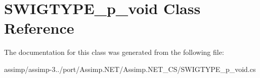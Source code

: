 \hypertarget{class_s_w_i_g_t_y_p_e__p__void}{\section{S\+W\+I\+G\+T\+Y\+P\+E\+\_\+p\+\_\+void Class Reference}
\label{class_s_w_i_g_t_y_p_e__p__void}
}


The documentation for this class was generated from the following file\+:\begin{DoxyCompactItemize}
\item 
assimp/assimp-\/3../port/\+Assimp.\+N\+E\+T/\+Assimp.\+N\+E\+T\+\_\+\+C\+S/S\+W\+I\+G\+T\+Y\+P\+E\+\_\+p\+\_\+void.\+cs\end{DoxyCompactItemize}
